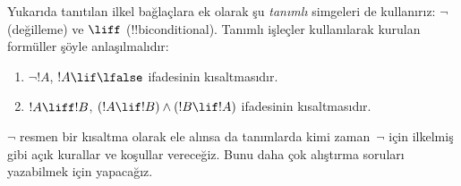 Yukarıda tanıtılan ilkel bağlaçlara ek olarak şu \emph{tanımlı} simgeleri de
kullanırız: $\lnot$ (değilleme) ve $\liff$ (!!{biconditional}). Tanımlı
işleçler kullanılarak kurulan formüller şöyle anlaşılmalıdır:
\begin{enumerate}
\item $\lnot !A$, $!A \lif \lfalse$ ifadesinin kısaltmasıdır.

\item $!A \liff !B$, $(!A \lif !B) \land (!B \lif !A)$ ifadesinin
  kısaltmasıdır.
\end{enumerate}

$\lnot$ resmen bir kısaltma olarak ele alınsa da tanımlarda kimi zaman~$\lnot$
için ilkelmiş gibi açık kurallar ve koşullar vereceğiz. Bunu daha çok alıştırma
soruları yazabilmek için yapacağız.

